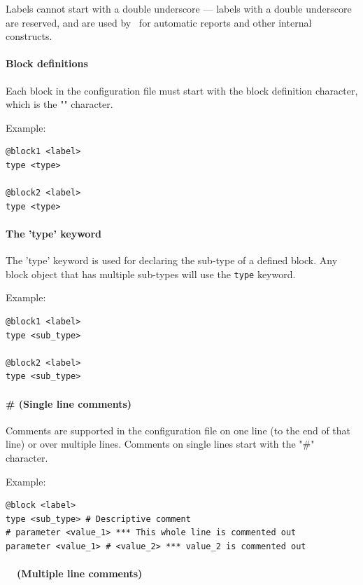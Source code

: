 Labels cannot start with a double underscore --- labels with a double underscore are reserved, and are used by \CNAME\ for automatic reports and other internal constructs.

\paragraph*{Block definitions}

Each block in the configuration file must start with the block definition character, which is the "\command" character.

Example:

{\small{\begin{verbatim}
@block1 <label>
type <type>

@block2 <label>
type <type>
\end{verbatim}}}

\paragraph*{The 'type' keyword}

The 'type' keyword is used for declaring the sub-type of a defined block. Any block object that has multiple sub-types will use the \texttt{type} keyword.

Example:

{\small{\begin{verbatim}
@block1 <label>
type <sub_type>

@block2 <label>
type <sub_type>
\end{verbatim}}}

\paragraph*{\# (Single line comments)}

Comments are supported in the configuration file on one line (to the end of that line) or over multiple lines.  Comments on single lines start with the "\#" character.

Example:

{\small{\begin{verbatim}
@block <label>
type <sub_type> # Descriptive comment
# parameter <value_1> *** This whole line is commented out
parameter <value_1> # <value_2> *** value_2 is commented out
\end{verbatim}}}

\paragraph*{\commentstart\ \commentend\ (Multiple line comments)}


